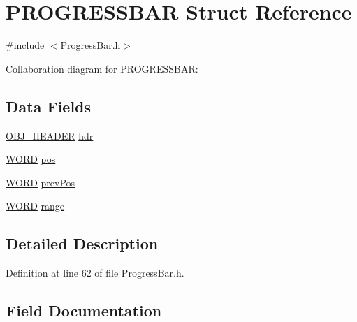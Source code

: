 \hypertarget{struct_p_r_o_g_r_e_s_s_b_a_r}{}\section{P\+R\+O\+G\+R\+E\+S\+S\+B\+A\+R Struct Reference}
\label{struct_p_r_o_g_r_e_s_s_b_a_r}


{\ttfamily \#include $<$Progress\+Bar.\+h$>$}



Collaboration diagram for P\+R\+O\+G\+R\+E\+S\+S\+B\+A\+R\+:
\subsection*{Data Fields}
\begin{DoxyCompactItemize}
\item 
\hyperlink{struct_o_b_j___h_e_a_d_e_r}{O\+B\+J\+\_\+\+H\+E\+A\+D\+E\+R} \hyperlink{struct_p_r_o_g_r_e_s_s_b_a_r_abeffaf353197a8a64fba6707b68ce0be}{hdr}
\item 
\hyperlink{_generic_type_defs_8h_a2b0e863dadf920709ec53d9088ee7c91}{W\+O\+R\+D} \hyperlink{struct_p_r_o_g_r_e_s_s_b_a_r_a334282e8dc9fb36245b63e871c6ed478}{pos}
\item 
\hyperlink{_generic_type_defs_8h_a2b0e863dadf920709ec53d9088ee7c91}{W\+O\+R\+D} \hyperlink{struct_p_r_o_g_r_e_s_s_b_a_r_ae5ba3b8b09a4e59718a9e126fab813fe}{prev\+Pos}
\item 
\hyperlink{_generic_type_defs_8h_a2b0e863dadf920709ec53d9088ee7c91}{W\+O\+R\+D} \hyperlink{struct_p_r_o_g_r_e_s_s_b_a_r_ab4dbd97dae01a95fd9e0deea02589374}{range}
\end{DoxyCompactItemize}


\subsection{Detailed Description}


Definition at line 62 of file Progress\+Bar.\+h.



\subsection{Field Documentation}
\hypertarget{struct_p_r_o_g_r_e_s_s_b_a_r_abeffaf353197a8a64fba6707b68ce0be}{}
